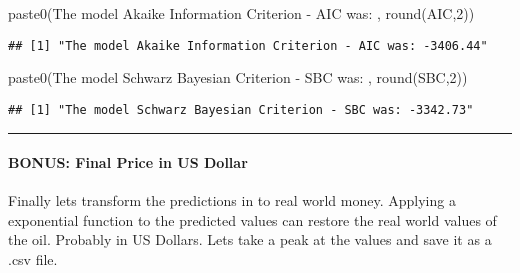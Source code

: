 \documentclass[
]{article}
\newenvironment{Shaded}{\begin{snugshade}}{\end{snugshade}}
\newcommand{\DecValTok}[1]{\textcolor[rgb]{0.00,0.00,0.81}{#1}}
\newcommand{\FunctionTok}[1]{\textcolor[rgb]{0.00,0.00,0.00}{#1}}
\newcommand{\NormalTok}[1]{#1}
\newcommand{\OtherTok}[1]{\textcolor[rgb]{0.56,0.35,0.01}{#1}}
\newcommand{\SpecialCharTok}[1]{\textcolor[rgb]{0.00,0.00,0.00}{#1}}
\newcommand{\StringTok}[1]{\textcolor[rgb]{0.31,0.60,0.02}{#1}}
\begin{document}
\begin{Shaded}
\begin{Highlighting}[]
\FunctionTok{paste0}\NormalTok{(}\StringTok{\textquotesingle{}The model Akaike Information Criterion {-} AIC was: \textquotesingle{}}\NormalTok{, }\FunctionTok{round}\NormalTok{(AIC,}\DecValTok{2}\NormalTok{))}
\end{Highlighting}
\end{Shaded}

\begin{verbatim}
## [1] "The model Akaike Information Criterion - AIC was: -3406.44"
\end{verbatim}

\begin{Shaded}
\begin{Highlighting}[]
\FunctionTok{paste0}\NormalTok{(}\StringTok{\textquotesingle{}The model Schwarz Bayesian Criterion {-} SBC was: \textquotesingle{}}\NormalTok{, }\FunctionTok{round}\NormalTok{(SBC,}\DecValTok{2}\NormalTok{))}
\end{Highlighting}
\end{Shaded}

\begin{verbatim}
## [1] "The model Schwarz Bayesian Criterion - SBC was: -3342.73"
\end{verbatim}

\begin{center}\rule{0.5\linewidth}{0.5pt}\end{center}

\hypertarget{bonus-final-price-in-us-dollar}{%
\paragraph{BONUS: Final Price in US
Dollar}\label{bonus-final-price-in-us-dollar}}

Finally lets transform the predictions in to real world money. Applying
a exponential function to the predicted values can restore the real
world values of the oil. Probably in US Dollars. Lets take a peak at the
values and save it as a .csv file.

\begin{Shaded}
\end{Shaded}
\end{document}
